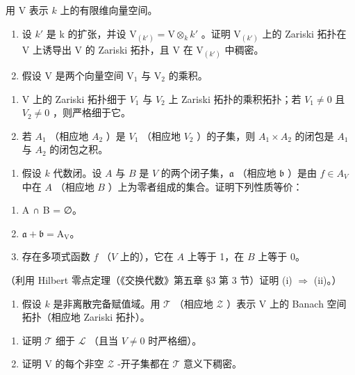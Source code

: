 
用 V 表示 \(k\) 上的有限维向量空间。

\begin{enumerate}
\def\labelenumi{\arabic{enumi})}
\item
  设 \(k'\) 是 k 的扩张，并设 \(\mathrm{V}_{(k')} = \mathrm{V} \otimes_k k'\) 。证明 \(\mathrm{V}_{(k')}\) 上的 Zariski 拓扑在 V 上诱导出 V 的 Zariski 拓扑，且 V 在 \(\mathrm{V}_{(k')}\) 中稠密。
\item
  假设 \(\mathrm{V}\) 是两个向量空间 \(\mathrm{V}_1\) 与 \(\mathrm{V}_2\) 的乘积。
\end{enumerate}

\begin{enumerate}
\def\labelenumi{\alph{enumi})}
\item
  V 上的 Zariski 拓扑细于 \(V_{1}\) 与 \(V_{2}\) 上 Zariski 拓扑的乘积拓扑；若 \(V_{1} \neq 0\) 且 \(V_{2} \neq 0\) ，则严格细于它。
\item
  若 \(A_{1}\) （相应地 \(A_{2}\) ）是 \(V_{1}\) （相应地 \(V_{2}\) ）的子集，则 \(A_{1} \times A_{2}\) 的闭包是 \(A_{1}\) 与 \(A_{2}\) 的闭包之积。
\end{enumerate}

\begin{enumerate}
\def\labelenumi{\arabic{enumi})}
\setcounter{enumi}{2}
\tightlist
\item
  假设 \(k\) 代数闭。设 \(A\) 与 \(B\) 是 \(V\) 的两个闭子集，\(\mathfrak{a}\) （相应地 \(\mathfrak{b}\) ）是由 \(f \in A_V\) 中在 \(A\) （相应地 \(B\) ）上为零者组成的集合。证明下列性质等价：
\end{enumerate}

\begin{enumerate}
\def\labelenumi{(\roman{enumi})}
\item
  A ∩ B = ∅。
\item
  \(\mathfrak{a} + \mathfrak{b} = \mathrm{A_V}\)。
\item
  存在多项式函数 \(f\) （\(V\) 上的），它在 \(A\) 上等于 1，在 \(B\) 上等于 0。
\end{enumerate}

（利用 Hilbert 零点定理（《交换代数》第五章 §3 第 3 节）证明 (i) \(\Longrightarrow\) (ii)。）

\begin{enumerate}
\def\labelenumi{\arabic{enumi})}
\setcounter{enumi}{3}
\tightlist
\item
  假设 \(k\) 是非离散完备赋值域。用 \(\mathcal{T}\) （相应地 \(\mathcal{Z}\) ）表示 V 上的 Banach 空间拓扑（相应地 Zariski 拓扑）。
\end{enumerate}

\begin{enumerate}
\def\labelenumi{\alph{enumi})}
\item
  证明 \(\mathcal{T}\) 细于 \(\mathcal{L}\) （且当 \(V \neq 0\) 时严格细）。
\item
  证明 V 的每个非空 \(\mathcal{Z}\) -开子集都在 \(\mathcal{T}\) 意义下稠密。
\end{enumerate}

